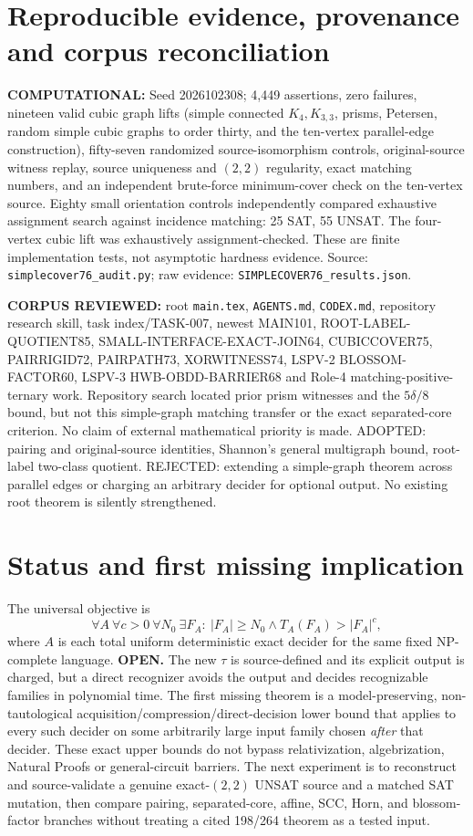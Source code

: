 \documentclass[11pt]{article}
\begin{document}
\section{Reproducible evidence, provenance and corpus reconciliation}
\textbf{COMPUTATIONAL:} Seed 2026102308; 4,449 assertions, zero failures, nineteen valid cubic graph lifts (simple connected $K_4,K_{3,3}$, prisms, Petersen, random simple cubic graphs to order thirty, and the ten-vertex parallel-edge construction), fifty-seven randomized source-isomorphism controls, original-source witness replay, source uniqueness and $(2,2)$ regularity, exact matching numbers, and an independent brute-force minimum-cover check on the ten-vertex source. Eighty small orientation controls independently compared exhaustive assignment search against incidence matching: 25 SAT, 55 UNSAT. The four-vertex cubic lift was exhaustively assignment-checked. These are finite implementation tests, not asymptotic hardness evidence. Source: \texttt{simplecover76\_audit.py}; raw evidence: \texttt{SIMPLECOVER76\_results.json}.

\textbf{CORPUS REVIEWED:} root \texttt{main.tex}, \texttt{AGENTS.md}, \texttt{CODEX.md}, repository research skill, task index/TASK-007, newest MAIN101, ROOT-LABEL-QUOTIENT85, SMALL-INTERFACE-EXACT-JOIN64, CUBICCOVER75, PAIRRIGID72, PAIRPATH73, XORWITNESS74, LSPV-2 BLOSSOM-FACTOR60, LSPV-3 HWB-OBDD-BARRIER68 and Role-4 matching-positive-ternary work. Repository search located prior prism witnesses and the $5\delta/8$ bound, but not this simple-graph matching transfer or the exact separated-core criterion. No claim of external mathematical priority is made. ADOPTED: pairing and original-source identities, Shannon's general multigraph bound, root-label two-class quotient. REJECTED: extending a simple-graph theorem across parallel edges or charging an arbitrary decider for optional output. No existing root theorem is silently strengthened.

\section{Status and first missing implication}
The universal objective is
\[
\forall A\ \forall c>0\ \forall N_0\ \exists F_A:\ 
|F_A|\ge N_0 \land T_A(F_A)>|F_A|^c,
\]
where $A$ is each total uniform deterministic exact decider for the same fixed NP-complete language. \textbf{OPEN.} The new $\tau$ is source-defined and its explicit output is charged, but a direct recognizer avoids the output and decides recognizable families in polynomial time. The first missing theorem is a model-preserving, non-tautological acquisition/compression/direct-decision lower bound that applies to every such decider on some arbitrarily large input family chosen \emph{after} that decider. These exact upper bounds do not bypass relativization, algebrization, Natural Proofs or general-circuit barriers. The next experiment is to reconstruct and source-validate a genuine exact-$(2,2)$ UNSAT source and a matched SAT mutation, then compare pairing, separated-core, affine, SCC, Horn, and blossom-factor branches without treating a cited 198/264 theorem as a tested input.
\end{document}
